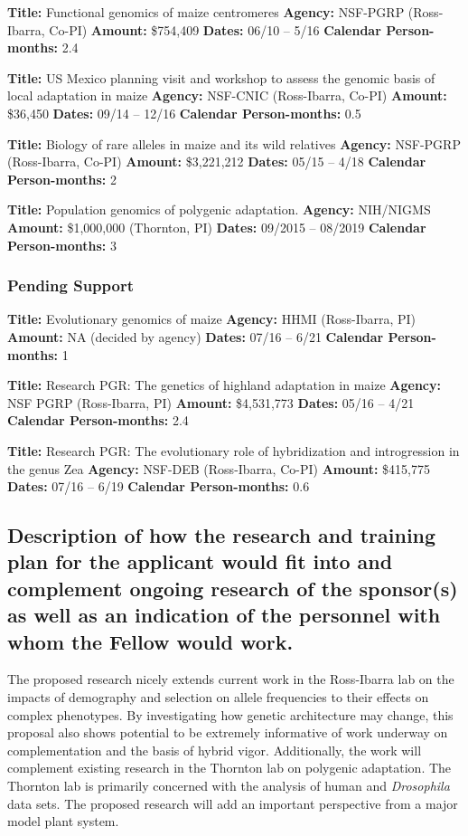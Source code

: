 \noindent\textbf{Title:} Functional genomics of maize centromeres 
\textbf{Agency:} NSF-PGRP (Ross-Ibarra, Co-PI)
\textbf{Amount:} \$754,409
\textbf{Dates:} 06/10 -- 5/16
\textbf{Calendar Person-months:} 2.4

\noindent\textbf{Title:} US Mexico planning visit and workshop to assess the genomic basis of local adaptation in maize 
\textbf{Agency:} NSF-CNIC (Ross-Ibarra, Co-PI) 
\textbf{Amount:} \$36,450
\textbf{Dates:} 09/14 -- 12/16
\textbf{Calendar Person-months:} 0.5

\noindent\textbf{Title:} Biology of rare alleles in maize and its wild relatives 
\textbf{Agency:} NSF-PGRP (Ross-Ibarra, Co-PI)
\textbf{Amount:} \$3,221,212
\textbf{Dates:} 05/15 -- 4/18
\textbf{Calendar Person-months:} 2

\noindent\textbf{Title:} Population genomics of polygenic adaptation. 
\textbf{Agency:} NIH/NIGMS 
\textbf{Amount:} \$1,000,000 (Thornton, PI)
\textbf{Dates:} 09/2015 -- 08/2019
\textbf{Calendar Person-months:} 3

\subsubsection*{Pending Support}

\noindent\textbf{Title:} Evolutionary genomics of maize 
\textbf{Agency:} HHMI (Ross-Ibarra, PI)
\textbf{Amount:} NA (decided by agency)
\textbf{Dates:} 07/16 -- 6/21
\textbf{Calendar Person-months:} 1

\noindent\textbf{Title:} Research PGR: The genetics of highland adaptation in maize
\textbf{Agency:} NSF PGRP (Ross-Ibarra, PI)
\textbf{Amount:} \$4,531,773
\textbf{Dates:} 05/16 -- 4/21
\textbf{Calendar Person-months:} 2.4

\noindent\textbf{Title:} Research PGR: The evolutionary role of hybridization and introgression in the genus Zea
\textbf{Agency:} NSF-DEB (Ross-Ibarra, Co-PI)
\textbf{Amount:} \$415,775
\textbf{Dates:} 07/16 -- 6/19
\textbf{Calendar Person-months:} 0.6

\subsection{Description of how the research and training plan for the applicant would fit into and complement ongoing research of the sponsor(s) as well as an indication of the personnel with whom the Fellow would work.}

The proposed research nicely extends current work in the Ross-Ibarra lab on the impacts of demography and selection on allele frequencies to their effects on complex phenotypes. By investigating how genetic architecture may change, this proposal also shows potential to be extremely informative of work underway on complementation and the basis of hybrid vigor.  Additionally, the work will complement existing research in the Thornton lab on polygenic adaptation.  The Thornton lab is primarily concerned with the analysis of human and \textit{Drosophila} data sets.  The proposed research will add an important perspective from a major model plant system.

